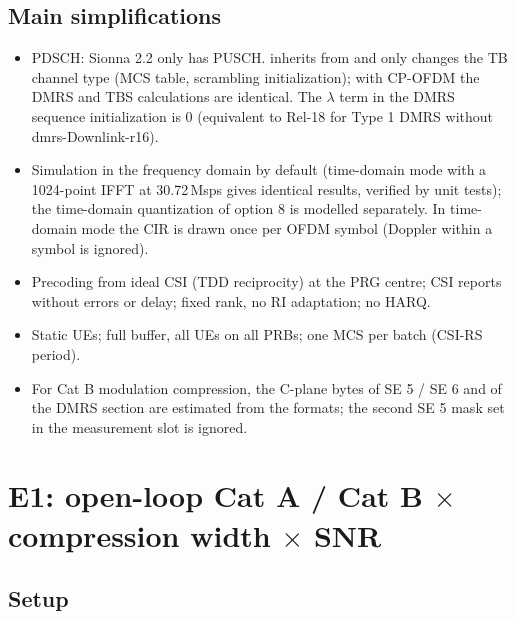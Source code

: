 \documentclass[11pt,a4paper]{article}
\DeclareRobustCommand{\code}[1]{\codeurl{#1}}  %
\begin{document}
\subsection{Main simplifications}

\begin{itemize}
  \item PDSCH: Sionna 2.2 only has PUSCH. \code{PDSCHConfig} inherits from \code{PUSCHConfig} and only changes the TB channel
        type (MCS table, scrambling initialization); with CP-OFDM the DMRS and TBS calculations are identical. The $\lambda$
        term in the DMRS sequence initialization is 0 (equivalent to Rel-18 for Type 1 DMRS without dmrs-Downlink-r16).
  \item Simulation in the frequency domain by default (time-domain mode with a 1024-point IFFT at 30.72\,Msps gives identical
        results, verified by unit tests); the time-domain quantization of option 8 is modelled separately. In time-domain mode
        the CIR is drawn once per OFDM symbol (Doppler within a symbol is ignored).
  \item Precoding from ideal CSI (TDD reciprocity) at the PRG centre; CSI reports without errors or delay; fixed rank, no RI
        adaptation; no HARQ.
  \item Static UEs; full buffer, all UEs on all PRBs; one MCS per batch (CSI-RS period).
  \item For Cat B modulation compression, the C-plane bytes of SE 5 / SE 6 and of the DMRS section are estimated from the
        formats; the second SE 5 mask set in the measurement slot is ignored.
\end{itemize}

\section{E1: open-loop Cat A / Cat B $\times$ compression width $\times$ SNR}

\subsection{Setup}
\end{document}
